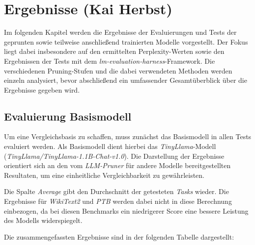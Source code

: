 \section{Ergebnisse (Kai Herbst)}\label{ergebnisse}

Im folgenden Kapitel werden die Ergebnisse der Evaluierungen und Tests der
geprunten sowie teilweise anschließend trainierten Modelle vorgestellt. Der
Fokus liegt dabei insbesondere auf den ermittelten Perplexity-Werten sowie den
Ergebnissen der Tests mit dem \emph{lm-evaluation-harness}-Framework. Die
verschiedenen Pruning-Stufen und die dabei verwendeten Methoden werden einzeln
analysiert, bevor abschließend ein umfassender Gesamtüberblick über die
Ergebnisse gegeben wird.

\subsection{Evaluierung Basismodell}\label{evaluation-basemodel}

Um eine Vergleichsbasis zu schaffen, muss zunächst das Basismodell in allen
Tests evaluiert werden. Als Basismodell dient hierbei das
\emph{TinyLlama}-Modell (\emph{TinyLlama/TinyLlama-1.1B-Chat-v1.0}). Die
Darstellung der Ergebnisse orientiert sich an den vom \emph{LLM-Pruner} für
andere Modelle bereitgestellten Resultaten, um eine einheitliche
Vergleichbarkeit zu gewährleisten.

Die Spalte \emph{Average} gibt den Durchschnitt der getesteten \emph{Tasks}
wieder. Die Ergebnisse für \emph{WikiText2} und \emph{PTB} werden dabei nicht in
diese Berechnung einbezogen, da bei diesen Benchmarks ein niedrigerer Score eine
bessere Leistung des Modells widerspiegelt.

Die zusammengefassten Ergebnisse sind in der folgenden Tabelle dargestellt:

\begin{table}[h]
	\centering
	\caption{Evaluierung des Basismodells}
	\label{tab:pruning}
\end{table}

